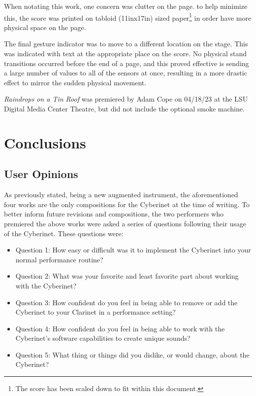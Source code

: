 When notating this work, one concern was clutter on the page. to help minimize this, the score was printed on tabloid (11inx17in) sized paper\footnote{The score has been scaled down to fit within this document.} in order have more physical space on the page. 

The final gesture indicator was to move to a different location on the stage. This was indicated with text at the appropriate place on the score. No physical stand transitions occurred before the end of a page, and this proved effective is sending a large number of values to all of the sensors at once, resulting in a more drastic effect to mirror the sudden physical movement.

\textit{Raindrops on a Tin Roof} was premiered by Adam Cope on 04/18/23 at the LSU Digital Media Center Theatre, but did not include the optional smoke machine.



\chapter{Conclusions} 

\section{User Opinions}

As previously stated, being a new augmented instrument, the aforementioned four works are the only compositions for the Cyberinet at the time of writing. To better inform future revisions and compositions, the two performers who premiered the above works were asked a series of questions following their usage of the Cyberinet. These questions were:

\begin{itemize}
    \item Question 1: How easy or difficult was it to implement the Cyberinet into your normal performance routine?
    \item Question 2: What was your favorite and least favorite part about working with the Cyberinet? 
    \item Question 3: How confident do you feel in being able to remove or add the Cyberinet to your Clarinet in a performance setting?
    \item Question 4: How confident do you feel in being able to work with the Cyberinet's software capabilities to create unique sounds?
    \item Question 5: What thing or things did you dislike, or would change, about the Cyberinet?
\end{itemize}

